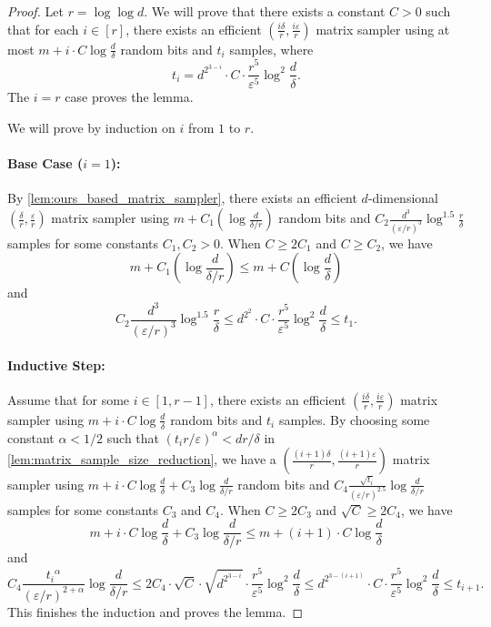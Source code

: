 \documentclass[11pt,letterpaper]{article}
\newcommand{\eps}{\varepsilon}
\newcommand{\1}{\mathbbm{1}}
\newcommand{\tuple}[1]{\left(#1\right)}
\begin{document}
    \begin{proof}
    Let $r = \log\log d$.
    We will prove that there exists a constant $C > 0$ such that for each $i \in [r]$, there exists an efficient $\left( \frac{i \delta}{r}, \frac{i \varepsilon}{r}\right)$ matrix sampler using at most $m + i \cdot C \log\frac{d}{\delta}$ random bits and $t_i$ samples, where
    \[
        t_i = d^{2^{3-i}} \cdot C \cdot \frac{r^5}{\eps^5} \log^2\frac{d}{\delta}.
    \]
    The $i = r$ case proves the lemma. 

    We will prove by induction on $i$ from $1$ to $r$.
    \paragraph{Base Case ($i = 1$):}
    By \cref{lem:ours_based_matrix_sampler}, there exists an efficient $d$-dimensional $(\frac{\delta}{r}, \frac{\varepsilon}{r})$ matrix sampler using $m + C_1( \log\frac{d}{\delta/r})$ random bits and $C_2\frac{d^3}{(\eps/r)^3}\log^{1.5} \frac{r}{\delta}$ samples for some constants $C_1, C_2 > 0$. When $C \ge 2C_1$ and $C \ge C_2$, we have \[
        m + C_1\tuple{\log\frac{d}{\delta/r}} \le m + C\left( \log\frac{d}{\delta} \right)
    \]
         and
    \[
    C_2\frac{d^3}{(\eps/r)^3}\log^{1.5} \frac{r}{\delta} \le d^{2^{2}} \cdot C \cdot \frac{r^5}{\eps^5} \log^2\frac{d}{\delta} \le t_1.
    \]
 
    
    \paragraph{Inductive Step:}
    Assume that for some $i \in [1, r-1]$, there exists an efficient $\left( \frac{i \delta}{r}, \frac{i \varepsilon}{r}\right)$ matrix sampler using $m + i \cdot C\log\frac{d}{\delta}$ random bits and $t_i$ samples.
    By choosing some constant $\alpha < 1/2$ such that $(t_i r / \eps)^\alpha < d r / \delta$ in \cref{lem:matrix_sample_size_reduction}, we have a $\left( \frac{(i+1) \delta}{r}, \frac{(i+1) \varepsilon}{r}\right)$ matrix sampler using $m + i \cdot C\log\frac{d}{\delta} + C_3 \log \frac{d}{\delta/ r}$ random bits and $C_4\frac{\sqrt{t_i}}{(\eps / r)^{2.5}}\log\frac{d}{\delta / r}$ samples for some constants $C_3$ and $C_4$. When $C \ge 2C_3$ and $\sqrt{C} \ge 2C_4$, we have\[
        m + i \cdot C\log\frac{d}{\delta} + C_3 \log \frac{d}{\delta / r} \le m + (i + 1) \cdot C\log\frac{d}{\delta}
    \]
    and \[
        C_4\frac{{t_i}^\alpha}{(\eps / r)^{2+\alpha}}\log\frac{d}{\delta / r} \le 2 C_4 \cdot \sqrt{C} \cdot \sqrt{d^{2^{3-i}}} \cdot \frac{r^5}{\eps^5} \log^2\frac{d}{\delta} \le d^{2^{3-(i+1)}} \cdot C \cdot \frac{r^5}{\eps^5} \log^2\frac{d}{\delta} \le t_{i+1}.
    \]
    This finishes the induction and proves the lemma.
\end{proof}
\end{document}
